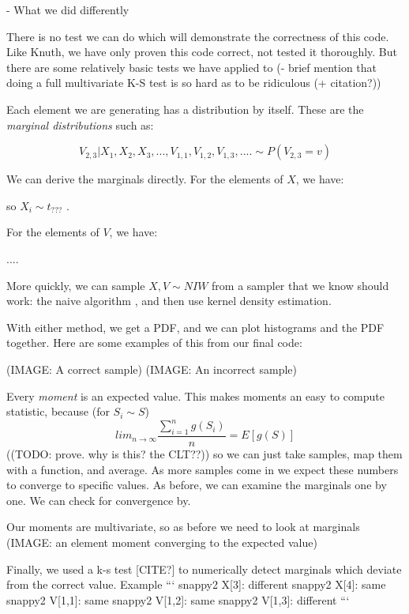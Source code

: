 \documentclass[english]{report}
\begin{document}
- What we did differently



There is no test we can do which will demonstrate the correctness of this code.
Like Knuth, we have only proven this code correct, not tested it thoroughly.
But there are some relatively basic tests we have applied to 
(- brief mention that doing a full multivariate K-S test is so hard as to be ridiculous (+ citation?))

Each element we are generating has a distribution by itself. These are the \emph{marginal distributions} such as:

$$ V_{2,3} | X_1, X_2, X_3, ..., V_{1,1}, V_{1,2}, V_{1,3} , ....  \sim P(V_{2,3} = v) $$

We can derive the marginals directly. For the elements of $X$, we have:


so  $X_i \sim t_{???}$ .

For the elements of $V$, we have:

....


More quickly, we can sample $X,V \sim NIW$ from a sampler that we know should work: the naive algorithm %
  , and then use kernel density estimation.
  
With either method, we get a PDF, and we can plot histograms and the PDF together. Here are some examples of this from our final code:

(IMAGE: A correct sample)
(IMAGE: An incorrect sample)


Every \emph{moment} is an expected value. This makes moments an easy to compute statistic,
 because (for $ S_i \sim S $)
$$ lim_{n \rightarrow \infty} \frac{\sum_{i=1}^n g(S_i)}{n} = E[g(S)] $$
  ((TODO: prove. why is this? the CLT??))
so we can just take samples, map them with a function, and average. As more samples come in we expect these numbers to converge to specific values. As before, we can examine the marginals one by one. We can check for convergence by.

Our moments are multivariate, so as before we need to look at marginals 
(IMAGE: an element moment converging to the expected value)

Finally, we used a k-s test [CITE?] to numerically detect marginals which deviate from the correct value. Example 
```
snappy2 X[3]: different
snappy2 X[4]: same
snappy2 V[1,1]: same
snappy2 V[1,2]: same
snappy2 V[1,3]: different
```
\end{document}
